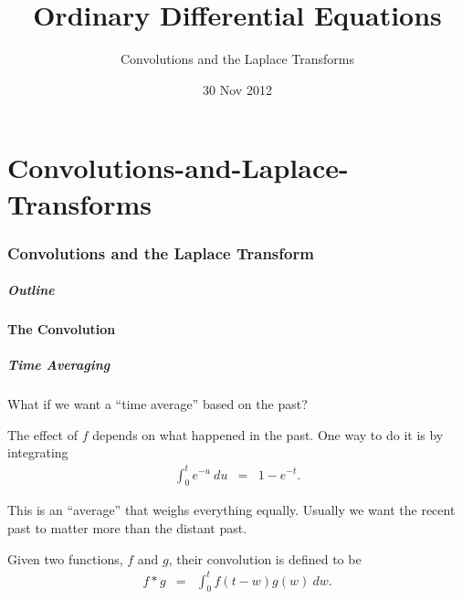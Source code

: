 \part{Convolutions-and-Laplace-Transforms}
\section{Convolutions and the Laplace Transform}

\title{Ordinary Differential Equations}
\subtitle{Convolutions and the Laplace Transforms}
\date{30 Nov 2012}

\begin{frame}
  \titlepage
\end{frame}

\begin{frame}
  \frametitle{Outline}
\end{frame}


\subsection{The Convolution}


\begin{frame}
  \frametitle{Time Averaging}

  What if we want a ``time average'' based on the past?


  {%

    The effect of $f$ depends on what happened in the past. One way to
    do it is by integrating
    \begin{eqnarray*}
      \int^t_0 e^{-u} ~ du & = & 1-e^{-t}.
    \end{eqnarray*}

  }

  {%

    This is an ``average'' that weighs everything equally. Usually we
    want the recent past to matter more than the distant past.
    
  }

\end{frame}

\begin{frame}
  \begin{definition}
    Given two functions, $f$ and $g$, their convolution is defined to be
    \begin{eqnarray*}
      f*g & = & \int^t_0 f(t-w) g(w) ~ dw.
    \end{eqnarray*}
  \end{definition}
\end{frame}

